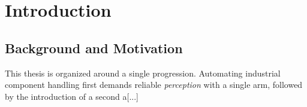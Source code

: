 \chapter{Introduction}

\section{Background and Motivation}\label{sec:intro_motivation}

This thesis is organized around a single progression. Automating industrial component handling first demands reliable \emph{perception} with a single arm, followed by the introduction of a second a[...]